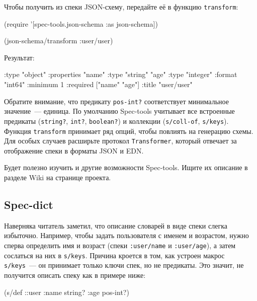 Чтобы получить из спеки JSON-схему, передайте её в функцию \verb|transform|:

\begin{english}
  \begin{clojure}
(require '[spec-tools.json-schema :as json-schema])

(json-schema/transform :user/user)
  \end{clojure}
\end{english}

\noindent
Результат:

\begin{english}
  \begin{clojure}
{:type "object"
 :properties
 {"name" {:type "string"}
  "age" {:type "integer"
         :format "int64"
         :minimum 1}}
 :required ["name" "age"]
 :title "user/user"}
  \end{clojure}
\end{english}

Обратите внимание, что предикату \verb|pos-int?| соответствует минимальное
значение~--- единица. По умолчанию Spec-tools учитывает все встроенные предикаты
(\verb|string?|, \verb|int?|, \verb|boolean?|) и коллекции (\verb|s/coll-of|,
\verb|s/keys|). Функция \verb|transform| принимает ряд опций, чтобы повлиять на
генерацию схемы. Для особых случаев расширьте протокол \verb|Transformer|,
который отвечает за отображение спеки в форматы JSON и EDN.

Будет полезно изучить и другие возможности Spec-tools. Ищите их описание в
разделе Wiki на странице проекта.

\subsection*{Spec-dict}

Наверняка читатель заметил, что описание словарей в виде спеки слегка
избыточно. Например, чтобы задать пользователя с именем и возрастом, нужно
сперва определить имя и возраст (спеки \verb|:user/name| и \verb|:user/age|), а
затем сослаться на них в \verb|s/keys|. Причина кроется в том, как устроен
макрос \verb|s/keys|~--- он принимает только ключи спек, но не предикаты. Это
значит, не получится описать спеку как в примере ниже:

\begin{english}
  \begin{clojure}
(s/def ::user
  {:name string?
   :age pos-int?})
  \end{clojure}
\end{english}

